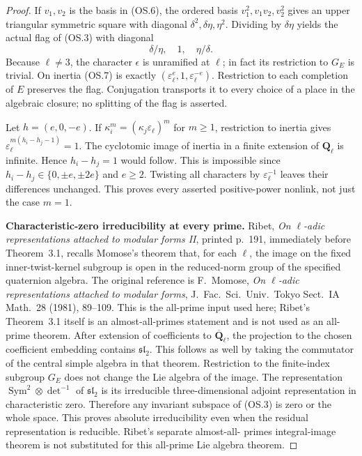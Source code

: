 \documentclass[11pt,a4paper]{article}
\theoremstyle{definition}
\renewcommand{\paragraph}[1]{\par\smallskip\noindent\textbf{#1}\quad\ignorespaces}
\begin{document}
\begin{proof}
If $v_1,v_2$ is the basis in (OS.6), the ordered basis
$v_1^2,v_1v_2,v_2^2$ gives an upper triangular symmetric
square with diagonal $\delta^2,\delta\eta,\eta^2$.
Dividing by $\delta\eta$ yields the actual flag of (OS.3)
with diagonal
\[
                    \delta/\eta,\quad1,\quad\eta/\delta.
                                                               \tag{OS.7}
\]
Because $\ell\ne3$, the character $\epsilon$ is unramified
at $\ell$; in fact its restriction to $G_E$ is trivial.
On inertia (OS.7) is exactly
$(\varepsilon_\ell^e,1,\varepsilon_\ell^{-e})$.
Restriction to each completion of $E$ preserves the flag.
Conjugation transports it to every choice of a place in the
algebraic closure; no splitting of the flag is asserted.

Let $h=(e,0,-e)$. If
$\kappa_i^m=(\kappa_j\varepsilon_\ell)^m$ for $m\geq1$,
restriction to inertia gives
$\varepsilon_\ell^{m(h_i-h_j-1)}=1$.
The cyclotomic image of inertia in a finite extension of
$\mathbf Q_\ell$ is infinite. Hence $h_i-h_j=1$ would
follow. This is impossible since
$h_i-h_j\in\{0,\pm e,\pm2e\}$ and $e\geq2$.
Twisting all characters by $\varepsilon_\ell^{-1}$ leaves
their differences unchanged. This proves every asserted
positive-power nonlink, not just the case $m=1$.

\paragraph{Characteristic-zero irreducibility at every prime.}
Ribet, \emph{On $\ell$-adic representations attached to modular
forms II}, printed p.~191, immediately before Theorem~3.1,
recalls Momose's theorem that, for each $\ell$, the image
on the fixed inner-twist-kernel subgroup is open in the
reduced-norm group of the specified quaternion algebra.
The original reference is F.~Momose, \emph{On $\ell$-adic
representations attached to modular forms}, J.~Fac.~Sci.\
Univ.~Tokyo Sect.~IA Math.~28 (1981), 89--109.
This is the all-prime input used here; Ribet's Theorem~3.1
itself is an almost-all-primes statement and is not used
as an all-prime theorem.
After extension of coefficients to $\overline{\mathbf Q}_\ell$,
the projection to the chosen coefficient embedding contains
$\mathfrak{sl}_2$. This follows as well by taking the
commutator of the central simple algebra in that theorem.
Restriction to the finite-index subgroup $G_E$ does not
change the Lie algebra of the image. The representation
$\operatorname{Sym}^2\otimes\det^{-1}$ of
$\mathfrak{sl}_2$ is its irreducible three-dimensional
adjoint representation in characteristic zero. Therefore
any invariant subspace of (OS.3) is zero or the whole space.
This proves absolute irreducibility even when the residual
representation is reducible. Ribet's separate almost-all-
primes integral-image theorem is not substituted for this
all-prime Lie algebra theorem.


\end{proof}
\end{document}
